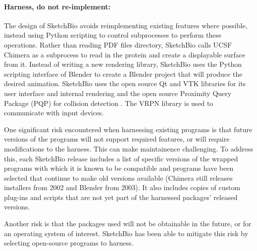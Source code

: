 \documentclass[twocolumn]{bmcart}%
\begin{document}
\paragraph*{Harness, do not re-implement:} The design of SketchBio avoids reimplementing existing features where possible, instead using Python scripting to control subprocesses to perform these operations.
Rather than reading PDF files directory, SketchBio calls UCSF Chimera as a subprocess to read in the protein and create a displayable surface from it.
Instead of writing a new rendering library, SketchBio uses the Python scripting interface of Blender to create a Blender project that will produce the desired animation.
SketchBio uses the open source Qt and VTK\cite{VTKbook} libraries for its user interface and internal rendering and the open source Proximity Query Package (PQP) for collision detection \cite{PQP}.
The VRPN library \cite{taylor2001vrpn} is used to communicate with input devices.

One significant risk encountered when harnessing existing programs is that future versions of the programs will not support required features, or will require modifications to the harness.
This can make maintainence challenging.
To address this, each SketchBio release includes a list of specific versions of the wrapped programs with which it is known to be compatible and programs have been selected that continue to make old versions available (Chimera still releases installers from 2002 and Blender from 2003). It also includes copies of custom plug-ins and scripts that are not yet part of the harnessed packages' released versions.

Another risk is that the packages used will not be obtainable in the future, or for an operating system of interest. SketchBio has been able to mitigate this risk by selecting open-source programs to harness.
\end{document}

